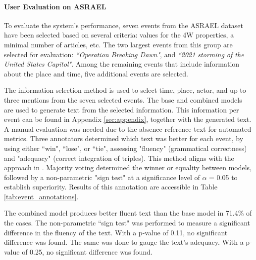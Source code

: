 \documentclass[
hf, %
]{ceurart}
\begin{document}
\paragraph*{User Evaluation on ASRAEL}
\label{sec:result_gen_text_nodes}
To evaluate the system's performance, seven events from the ASRAEL dataset have been selected based on several criteria: values for the 4W properties, a minimal number of articles, etc. The two largest events from this group are selected for evaluation: \textit{``Operation Breaking Dawn"}, and \textit{``2021 storming of the United States Capitol"}. Among the remaining events that include information about the place and time, five additional events are selected.

The information selection method is used to select time, place, actor, and up to three mentions from the seven selected events. The base and combined models are used to generate text from the selected information. This information per event can be found in Appendix \ref{sec:appendix}, together with the generated text. A manual evaluation was needed due to the absence reference text for automated metrics.
Three annotators determined which text was better for each event, by using either ``win", ``lose", or ``tie", assessing "fluency" (grammatical correctness) and "adequacy" (correct integration of triples). This method aligns with the approach in \cite{JointGT}. Majority voting determined the winner or equality between models, followed by a non-parametric "sign test" at a significance level of $\alpha$ = 0.05 to establish superiority. Results of this annotation are accessible in Table \ref{tab:event_annotations}.

The combined model produces better fluent text than the base model in 71.4\% of the cases. The non-parametric ``sign test" was performed to measure a significant difference in the fluency of the text. With a p-value of 0.11, no significant difference was found. The same was done to gauge the text's adequacy. With a p-value of 0.25, no significant difference was found.
\end{document}
